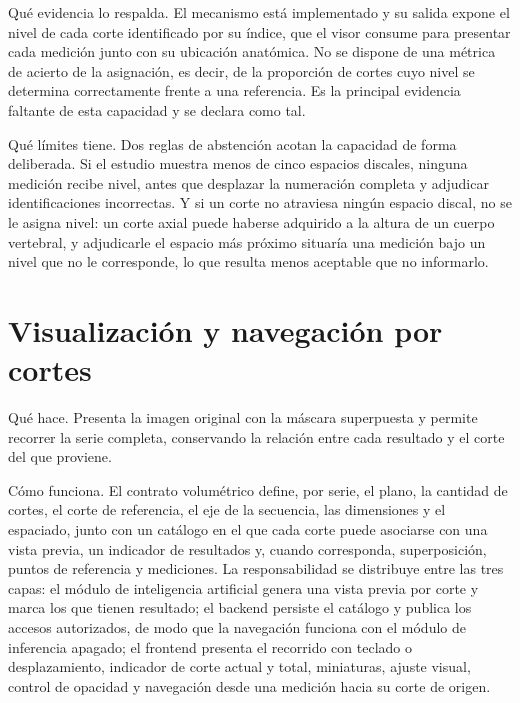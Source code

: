 Qué evidencia lo respalda. El mecanismo está implementado y su salida expone el nivel de cada corte identificado por su índice, que el visor consume para presentar cada medición junto con su ubicación anatómica. No se dispone de una métrica de acierto de la asignación, es decir, de la proporción de cortes cuyo nivel se determina correctamente frente a una referencia. Es la principal evidencia faltante de esta capacidad y se declara como tal.

Qué límites tiene. Dos reglas de abstención acotan la capacidad de forma deliberada. Si el estudio muestra menos de cinco espacios discales, ninguna medición recibe nivel, antes que desplazar la numeración completa y adjudicar identificaciones incorrectas. Y si un corte no atraviesa ningún espacio discal, no se le asigna nivel: un corte axial puede haberse adquirido a la altura de un cuerpo vertebral, y adjudicarle el espacio más próximo situaría una medición bajo un nivel que no le corresponde, lo que resulta menos aceptable que no informarlo.

\section{Visualización y navegación por cortes}

Qué hace. Presenta la imagen original con la máscara superpuesta y permite recorrer la serie completa, conservando la relación entre cada resultado y el corte del que proviene.

Cómo funciona. El contrato volumétrico define, por serie, el plano, la cantidad de cortes, el corte de referencia, el eje de la secuencia, las dimensiones y el espaciado, junto con un catálogo en el que cada corte puede asociarse con una vista previa, un indicador de resultados y, cuando corresponda, superposición, puntos de referencia y mediciones. La responsabilidad se distribuye entre las tres capas: el módulo de inteligencia artificial genera una vista previa por corte y marca los que tienen resultado; el backend persiste el catálogo y publica los accesos autorizados, de modo que la navegación funciona con el módulo de inferencia apagado; el frontend presenta el recorrido con teclado o desplazamiento, indicador de corte actual y total, miniaturas, ajuste visual, control de opacidad y navegación desde una medición hacia su corte de origen.


